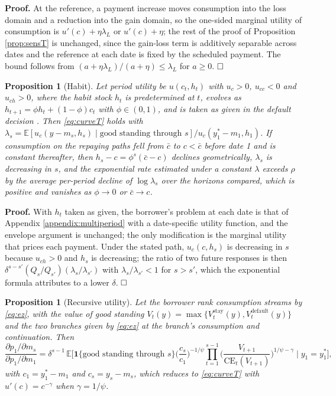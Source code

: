 \documentclass[12pt,english]{article}
\newtheorem{proposition}[theorem]{Proposition}
\begin{document}
\noindent\textbf{Proof.} At the reference, a payment increase moves consumption into the loss domain and a reduction into the gain domain, so the one-sided marginal utility of consumption is $u'(c) + \eta\lambda_L$ or $u'(c) + \eta$; the rest of the proof of Proposition \ref{prop:sensT} is unchanged, since the gain-loss term is additively separable across dates and the reference at each date is fixed by the scheduled payment. The bound follows from $(a + \eta\lambda_L)/(a + \eta) \le \lambda_L$ for $a \ge 0$. $\hfill\square$

\begin{proposition}[Habit]\label{prop:habit}
Let period utility be $u(c_t, h_t)$ with $u_c > 0$, $u_{cc} < 0$ and $u_{ch} > 0$, where the habit stock $h_t$ is predetermined at $t$, evolves as $h_{t+1} = \phi h_t + (1-\phi)c_t$ with $\phi \in (0,1)$, and is taken as given in the default decision \citep{campbell_force_1999}. Then \eqref{eq:curveT} holds with $\lambda_s = \mathbb{E}[u_c(y - m_s, h_s) \mid \text{good standing through } s]/u_c(y^*_1 - m_1, h_1)$. If consumption on the repaying paths fell from $\bar c$ to $c < \bar c$ before date 1 and is constant thereafter, then $h_s - c = \phi^{s}(\bar c - c)$ declines geometrically, $\lambda_s$ is decreasing in $s$, and the exponential rate estimated under a constant $\lambda$ exceeds $\rho$ by the average per-period decline of $\log\lambda_s$ over the horizons compared, which is positive and vanishes as $\phi \to 0$ or $\bar c \to c$.
\end{proposition}

\noindent\textbf{Proof.} With $h_t$ taken as given, the borrower's problem at each date is that of Appendix \ref{appendix:multiperiod} with a date-specific utility function, and the envelope argument is unchanged; the only modification is the marginal utility that prices each payment. Under the stated path, $u_c(c, h_s)$ is decreasing in $s$ because $u_{ch} > 0$ and $h_s$ is decreasing; the ratio of two future responses is then $\delta^{s-s'}(Q_s/Q_{s'})(\lambda_s/\lambda_{s'})$ with $\lambda_s/\lambda_{s'} < 1$ for $s > s'$, which the exponential formula attributes to a lower $\delta$. $\hfill\square$

\begin{proposition}[Recursive utility]\label{prop:ezT}
Let the borrower rank consumption streams by \eqref{eq:ez}, with the value of good standing $V_t(y) = \max\{V^{\text{stay}}_t(y), V^{\text{default}}_t(y)\}$ and the two branches given by \eqref{eq:ez} at the branch's consumption and continuation. Then
\[
\frac{\partial p_1/\partial m_s}{\partial p_1/\partial m_1} = \delta^{s-1}\,\mathbb{E}\Big[\mathbf{1}\{\text{good standing through } s\}\Big(\frac{c_s}{c_1}\Big)^{-1/\psi}\prod_{t=1}^{s-1}\Big(\frac{V_{t+1}}{\mathrm{CE}_t(V_{t+1})}\Big)^{1/\psi-\gamma}\;\Big|\; y_1 = y^*_1\Big],
\]
with $c_1 = y^*_1 - m_1$ and $c_s = y_s - m_s$, which reduces to \eqref{eq:curveT} with $u'(c) = c^{-\gamma}$ when $\gamma = 1/\psi$.
\end{proposition}
\end{document}
